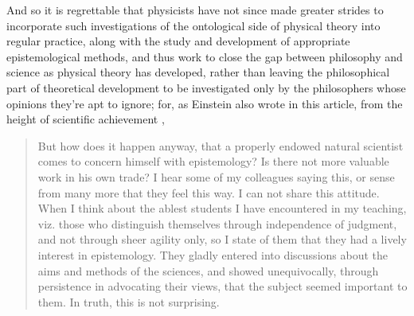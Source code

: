 And so it is regrettable that physicists have not since made greater strides to incorporate such investigations of the ontological side of physical theory into regular practice, along with the study and development of appropriate epistemological methods, and thus work to close the gap between philosophy and science as physical theory has developed, rather than leaving the philosophical part of theoretical development to be investigated only by the philosophers whose opinions they're apt to ignore; for, as Einstein also wrote in this article, from the height of scientific achievement \cite{Einstein1916}, 
\begin{quotation}


But how does it happen anyway, that a properly endowed natural scientist comes to concern himself with epistemology? Is there not more valuable work in his own trade? I hear some of my colleagues saying this, or sense from many more that they feel this way. I can not share this attitude. When I think about the ablest students I have encountered in my teaching, viz. those who distinguish themselves through independence of judgment, and not through sheer agility only, so I state of them that they had a lively interest in epistemology. They gladly entered into discussions about the aims and methods of the sciences, and showed unequivocally, through persistence in advocating their views, that the subject seemed important to them. In truth, this is not surprising.


\end{quotation}
